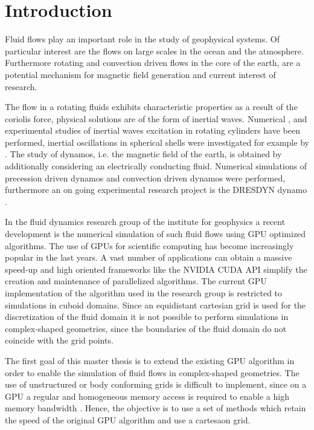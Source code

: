 \chapter*{Introduction}

Fluid flows play an important role in the study of geophysical systems.
Of particular interest are the flows on large scales in the ocean and the atmosphere.
Furthermore rotating and convection driven flows in the core of the earth, are a potential mechanism
for magnetic field generation and current interest of research.

The flow in a rotating fluids exhibits characteristic properties as a result of the coriolis force,
physical solutions are of the form of inertial waves.
Numerical \citep{Sauret2012}, \citep{Duguet} and experimental
studies \citep{QUOTE} of inertial waves excitation in rotating cylinders have been performed,
inertial oscillations in spherical shells were investigated for example by \citep{Tilgner1999}.
The study of dynamos, i.e. the magnetic field of the earth, is obtained by additionally
considering an electrically conducting fluid.
Numerical simulations of precession driven dynamos \citep{Tilgner2005}
and convection driven dynamos \citep{Tilgner2012} were performed, furthermore
an on going experimental research project is the DRESDYN dynamo \citep{Stefani2015}.

In the fluid dynamics research group of the institute for geophysics
a recent development is the numerical simulation of such fluid flows using GPU optimized algorithms.
The use of GPUs for scientific computing has become increasingly popular in the last years.
A vast number of applications  can obtain a massive speed-up and
high oriented frameworks like the NVIDIA CUDA API simplify the creation
and maintenance of parallelized algorithms.
The current GPU implementation of the algorithm used in the research group is restricted
to simulations in cuboid domains.
Since an equidistant cartesian grid is used for the discretization of the fluid
domain it is not possible to perform simulations in complex-shaped geometries,
since the boundaries of the fluid domain  do not coincide with the grid points.

\bigbreak

The first goal of this master thesis is to extend the existing GPU algorithm
in order to enable the simulation of fluid flows in complex-shaped geometries.
The use of unstructured or body conforming grids is difficult to implement,
since on a GPU a regular and homogeneous memory access is required to enable a high memory bandwidth \citep{CUDABP}.
Hence, the objective is to use a set of methods which retain the speed of the original GPU algorithm and use a cartesaon grid.

